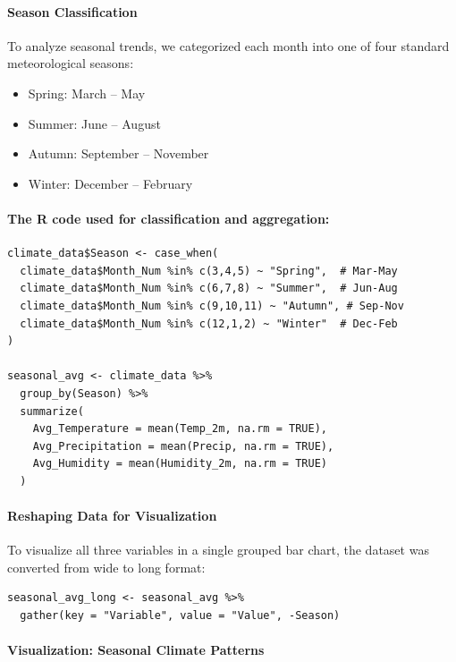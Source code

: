 \paragraph{Season Classification} To analyze seasonal trends, we categorized each month into one of four standard meteorological seasons:
\begin{itemize}
  \item Spring: March – May
  \item Summer: June – August
  \item Autumn: September – November
  \item Winter: December – February
\end{itemize}

\paragraph{The R code used for classification and aggregation:}

\begin{verbatim}
climate_data$Season <- case_when(
  climate_data$Month_Num %in% c(3,4,5) ~ "Spring",  # Mar-May
  climate_data$Month_Num %in% c(6,7,8) ~ "Summer",  # Jun-Aug
  climate_data$Month_Num %in% c(9,10,11) ~ "Autumn", # Sep-Nov
  climate_data$Month_Num %in% c(12,1,2) ~ "Winter"  # Dec-Feb
)

seasonal_avg <- climate_data %>%
  group_by(Season) %>%
  summarize(
    Avg_Temperature = mean(Temp_2m, na.rm = TRUE),
    Avg_Precipitation = mean(Precip, na.rm = TRUE),
    Avg_Humidity = mean(Humidity_2m, na.rm = TRUE)
  )
\end{verbatim}

\paragraph{Reshaping Data for Visualization}

To visualize all three variables in a single grouped bar chart, the dataset was converted from wide to long format:

\begin{verbatim}
seasonal_avg_long <- seasonal_avg %>%
  gather(key = "Variable", value = "Value", -Season)
\end{verbatim}

\paragraph{Visualization: Seasonal Climate Patterns}

